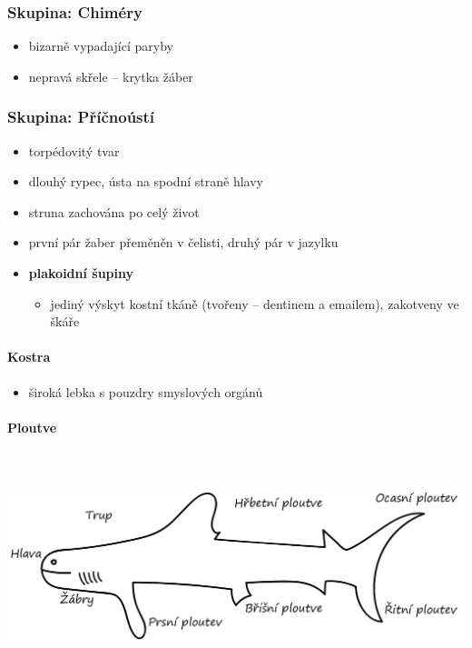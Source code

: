 \subsubsection{Skupina: Chiméry}
\begin{itemize}
\item bizarně vypadající paryby
\item nepravá skřele -- krytka žáber
\end{itemize}

\subsubsection{Skupina: Příčnoústí}
\begin{itemize}
\item torpédovitý tvar
\item dlouhý rypec, ústa na spodní straně hlavy
\item struna zachována po celý život
\item první pár žaber přeměněn v čelisti, druhý pár v jazylku
\item \textbf{plakoidní šupiny}
\begin{itemize}
\item jediný výskyt kostní tkáně (tvořeny -- dentinem a emailem), zakotveny ve škáře
\end{itemize}
\end{itemize}

\paragraph{Kostra}
\begin{itemize}
\item široká lebka s pouzdry smyslových orgánů
\end{itemize}

\paragraph{Ploutve}\mbox{} \\ \mbox{} \\
\includegraphics[width=\textwidth]{pictures/ploutve.png}


